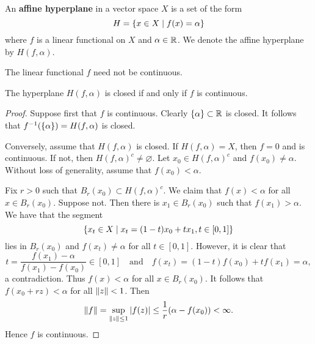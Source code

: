 \begin{definition}
    An \textbf{affine hyperplane} in a vector space $X$ is a set 
    of the form 
    \begin{equation*}
        H = \left\{ x\in X \;\middle\vert\; f(x) = \alpha \right\}
    \end{equation*}
    where $f$ is a linear functional on $X$ and $\alpha\in \mathbb{R}$. 
    We denote the affine hyperplane by $H(f, \alpha)$.
\end{definition}
\begin{remark}
    The linear functional $f$ need not be continuous. 
\end{remark}

\begin{proposition}
    The hyperplane $H(f,\alpha)$ is closed if and only if $f$ is continuous.
\end{proposition}
\begin{proof}
    Suppose first that $f$ is continuous. Clearly $\left\{ {\alpha} \right\}\subset\mathbb{R}$ is 
    closed. It follows that $f^{-1}(\left\{ {\alpha} \right\}) = H(f,\alpha)$ is closed. 
    
    Conversely, assume that $H(f,\alpha)$ is closed. If $H(f,\alpha) = X$, then 
    $f = 0$ and is continuous. If not, then $H(f,\alpha)^c\neq\varnothing$. Let 
    $x_0\in H(f,\alpha)^c$ and $f(x_0) \neq \alpha$. Without loss of generality, 
    assume that $f(x_0) < \alpha$. 
    
    Fix $r > 0$ such that $B_r(x_0)\subset H(f,\alpha)^c$. We claim that 
    $f(x) <\alpha$ for all $x\in B_r(x_0)$. Suppose not. Then there is $x_1\in B_r(x_0)$ 
    such that $f(x_1) > \alpha$. We have that the segment 
    \begin{equation*}
        \left\{ x_t\in X \;\middle\vert\; x_t = (1-t)x_0 + tx_1, t\in [0,1] \right\}
    \end{equation*}
    lies in $B_r(x_0)$ and $f(x_t)\neq \alpha$ for all $t\in [0,1]$. However, 
    it is clear that 
    \begin{equation*}
        t = \frac{f(x_1) - \alpha}{f(x_1) - f(x_0)} \in [0,1] 
        \quad\text{and} \quad 
        f(x_t) = (1-t)f(x_0) + tf(x_1) = \alpha,
    \end{equation*}
    a contradiction. Thus $f(x) < \alpha$ for all $x\in B_r(x_0)$. It follows 
    that $f(x_0 + rz) < \alpha$ for all $\left\lVert {z} \right\rVert < 1$. Then 
    \begin{equation*}
        \left\lVert {f} \right\rVert = \sup_{\left\lVert {z} \right\rVert\leq 1} \left\lvert {f(z)} \right\rvert \leq \frac{1}{r}(\alpha - f(x_0)) < \infty.
    \end{equation*}
    Hence $f$ is continuous.
\end{proof}

